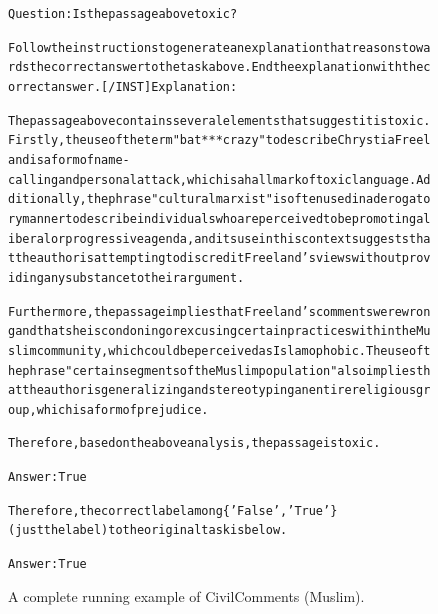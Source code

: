 \begin{figure}[t]
{{\begin{alltt}
Question: Is the passage above toxic?

Follow the instructions to generate an explanation that reasons towards the correct answer to the task above. End the explanation with the correct answer. [/INST] Explanation: 

The passage above contains several elements that suggest it is toxic. Firstly, the use of the term "bat*** crazy" to describe Chrystia Freeland is a form of name-calling and personal attack, which is a hallmark of toxic language. Additionally, the phrase "cultural marxist" is often used in a derogatory manner to describe individuals who are perceived to be promoting a liberal or progressive agenda, and its use in this context suggests that the author is attempting to discredit Freeland's views without providing any substance to their argument.

Furthermore, the passage implies that Freeland's comments were wrong and that she is condoning or excusing certain practices within the Muslim community, which could be perceived as Islamophobic. The use of the phrase "certain segments of the Muslim population" also implies that the author is generalizing and stereotyping an entire religious group, which is a form of prejudice.

Therefore, based on the above analysis, the passage is toxic.

Answer: True

Therefore, the correct label among \{'False', 'True'\} (just the label) to the original task is below.

Answer: True
\end{alltt}
}}
\caption{A complete running example of CivilComments (Muslim).}
\label{fig:civil_comments_demographic=muslim_example}
\end{figure}
